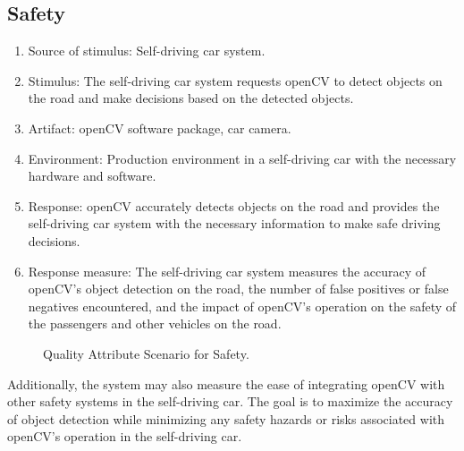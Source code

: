 \subsection{Safety\label{subSection::SafetyQA}}
\begin{enumerate}
    \item Source of stimulus: Self-driving car system.
    \item Stimulus: The self-driving car system requests openCV to detect objects on the road and make decisions based on the detected objects.
    \item Artifact: openCV software package, car camera.
    \item Environment: Production environment in a self-driving car with the necessary hardware and software.
    \item Response: openCV accurately detects objects on the road and provides the self-driving car system with the necessary information to make safe driving decisions.
    \item Response measure: The self-driving car system measures the accuracy of openCV's object detection on the road, the number of false positives or false negatives encountered, and the impact of openCV's operation on the safety of the passengers and other vehicles on the road.
\end{enumerate}
\begin{figure}[H]
\centering
{}
\caption{\label{Figure::Quality Attribute Scenario for Safety} Quality Attribute Scenario for Safety.}
\end{figure}
Additionally, the system may also measure the ease of integrating openCV with other safety systems in the self-driving car. The goal is to maximize the accuracy of object detection while minimizing any safety hazards or risks associated with openCV's operation in the self-driving car.
